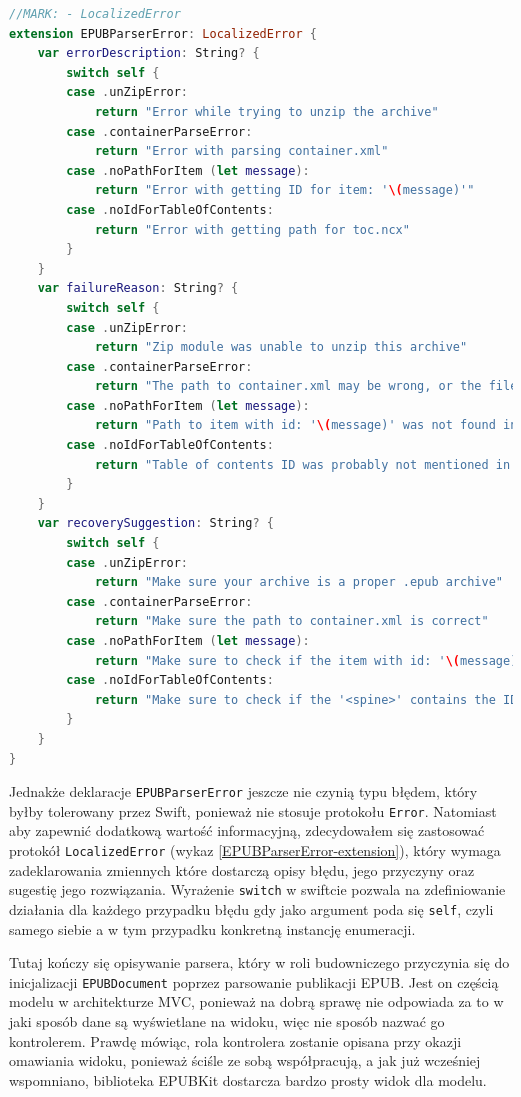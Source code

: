\begin{lstlisting}[firstnumber=8,caption={Rozszeżenie EPUBParserError z zastosowaniem protokołu LocalizedError},language=swift,label=EPUBParserError-extension]
//MARK: - LocalizedError
extension EPUBParserError: LocalizedError {
    var errorDescription: String? {
        switch self {
        case .unZipError:
            return "Error while trying to unzip the archive"
        case .containerParseError:
            return "Error with parsing container.xml"
        case .noPathForItem (let message):
            return "Error with getting ID for item: '\(message)'"
        case .noIdForTableOfContents:
            return "Error with getting path for toc.ncx"
        }
    }
    var failureReason: String? {
        switch self {
        case .unZipError:
            return "Zip module was unable to unzip this archive"
        case .containerParseError:
            return "The path to container.xml may be wrong, or the file itself may be missing"
        case .noPathForItem (let message):
            return "Path to item with id: '\(message)' was not found in the manifest!"
        case .noIdForTableOfContents:
            return "Table of contents ID was probably not mentioned in the spine"
        }
    }
    var recoverySuggestion: String? {
        switch self {
        case .unZipError:
            return "Make sure your archive is a proper .epub archive"
        case .containerParseError:
            return "Make sure the path to container.xml is correct"
        case .noPathForItem (let message):
            return "Make sure to check if the item with id: '\(message)' is in the manifest!"
        case .noIdForTableOfContents:
            return "Make sure to check if the '<spine>' contains the ID for TOC"
        }
    }
}
\end{lstlisting}

Jednakże deklaracje \texttt{EPUBParserError} jeszcze nie czynią typu błędem, który byłby tolerowany przez Swift, ponieważ nie stosuje protokołu \texttt{Error}. Natomiast aby zapewnić dodatkową wartość informacyjną, zdecydowałem się zastosować protokół \texttt{LocalizedError} (wykaz \ref{EPUBParserError-extension}), który wymaga zadeklarowania zmiennych które dostarczą opisy błędu, jego przyczyny oraz sugestię jego rozwiązania. Wyrażenie \texttt{switch} w swiftcie pozwala na zdefiniowanie działania dla każdego przypadku błędu gdy jako argument poda się \texttt{self}, czyli samego siebie a w tym przypadku konkretną instancję enumeracji.

Tutaj kończy się opisywanie parsera, który w roli budowniczego przyczynia się do inicjalizacji \texttt{EPUBDocument} poprzez parsowanie publikacji EPUB. Jest on częścią modelu w architekturze MVC, ponieważ na dobrą sprawę nie odpowiada za to w jaki sposób dane są wyświetlane na widoku, więc nie sposób nazwać go kontrolerem. Prawdę mówiąc, rola kontrolera zostanie opisana przy okazji omawiania widoku, ponieważ ściśle ze sobą współpracują, a jak już wcześniej wspomniano, biblioteka EPUBKit dostarcza bardzo prosty widok dla modelu.

